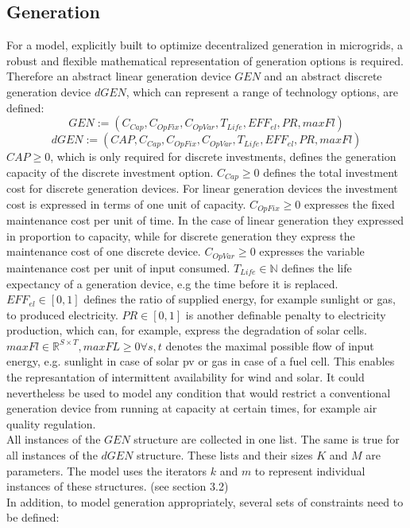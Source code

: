 \documentclass[
	11pt,								%
	DIV10,								%
	a4paper,         					%
	oneside,							%
	headheight=20pt,					%
	footheight=20pt,					%
    parskip=full,						%
    listof=totoc,						%
	bibliography=totoc,					%
	index=totoc,						%
]{scrartcl}
\begin{document}
\subsection{Generation}
For a model, explicitly built to optimize decentralized generation in microgrids, a robust and flexible mathematical representation of generation options is required.
Therefore an abstract linear generation device $GEN$ and an abstract discrete generation device $dGEN$, which can represent a range of technology options, are defined:\\
	\begin{equation}
		GEN := (C_{Cap}, C_{OpFix}, C_{OpVar}, T_{Life}, EFF_{el}, PR, maxFl)
	\end{equation}
	\begin{equation}
		dGEN := (CAP, C_{Cap}, C_{OpFix}, C_{OpVar}, T_{Life}, EFF_{el}, PR, maxFl)
	\end{equation}
	$CAP \geq 0$, which is only required for discrete investments, defines the generation capacity of the discrete investment option.
	$C_{Cap} \geq 0$ defines the total investment cost for discrete generation devices. For linear generation devices the investment cost is expressed in terms of one unit of capacity.
	$C_{OpFix} \geq 0$ expresses the fixed maintenance cost per unit of time. In the case of linear generation they expressed in proportion to capacity, while for discrete generation they express the maintenance cost of one discrete device.
	$C_{OpVar} \geq 0$ expresses the variable maintenance cost per unit of input consumed.
	$T_{Life} \in \mathbb{N}$ defines the life expectancy of a generation device, e.g the time before it is replaced. 
	$EFF_{el} \in [0,1]$ defines the ratio of supplied energy, for example sunlight or gas, to produced electricity.
	$PR \in [0,1]$ is another definable penalty to electricity production, which can, for example, express the degradation of solar cells. 	
	$maxFl \in \mathbb{R}^{S \times T}, maxFL \geq 0 \forall s,t$ denotes the maximal possible flow of input energy, e.g. sunlight in case of solar pv or gas in case of a fuel cell. This enables the represantation of intermittent availability for wind and solar. It could nevertheless be used to model any condition that would restrict a conventional generation device from running at capacity at certain times, for example air quality regulation.  \\
	All instances of the $GEN$ structure are collected in one list. The same is true for all instances of the $dGEN$ structure. These lists and their sizes $K$ and $M$ are parameters. The model uses the iterators $k$ and $m$ to represent individual instances of these structures. (see section 3.2)
	\\
	In addition, to model generation appropriately, several sets of constraints need to be defined:
	
\end{document}
